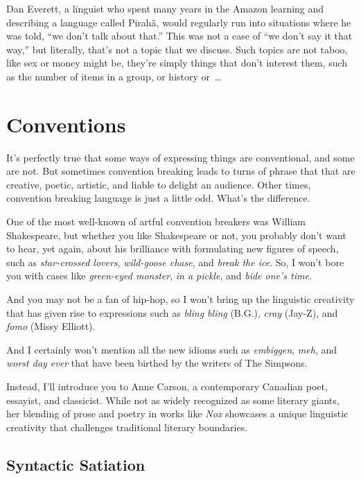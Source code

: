 Dan Everett, a linguist who spent many years in the Amazon learning and describing a language called Pirahã, would regularly run into situations where he was told, ``we don't talk about that.'' This was not a case of ``we don't say it that way,'' but literally, that's not a topic that we discuss. Such topics are not taboo, like sex or money might be, they're simply things that don't interest them, such as the number of items in a group, or history or~\dots

\section{Conventions}

It's perfectly true that some ways of expressing things are conventional, and some are not. But sometimes convention breaking leads to turns of phrase that that are creative, poetic, artistic, and liable to delight an audience. Other times, convention breaking language is just a little odd. What's the difference.

One of the most well-known of artful convention breakers was William Shakespeare, but whether you like Shakespeare or not, you probably don't want to hear, yet again, about his brilliance with formulating new figures of speech, such as \textit{star-crossed lovers}, \textit{wild-goose chase}, and \textit{break the ice}. So, I won't bore you with cases like \textit{green-eyed monster}, \textit{in a pickle}, and \textit{bide one's time}.

And you may not be a fan of hip-hop, so I won't bring up the linguistic creativity that has given rise to expressions such as \textit{bling bling} (B.G.), \textit{cray} (Jay-Z), and \textit{fomo} (Missy Elliott).

And I certainly won't mention all the new idioms such as \textit{embiggen}, \textit{meh}, and \textit{worst day ever} that have been birthed by the writers of The Simpsons.

Instead, I'll introduce you to Anne Carson, a contemporary Canadian poet, essayist, and classicist. While not as widely recognized as some literary giants, her blending of prose and poetry in works like \textit{Nox} showcases a unique linguistic creativity that challenges traditional literary boundaries.

\subsection{Syntactic Satiation}


